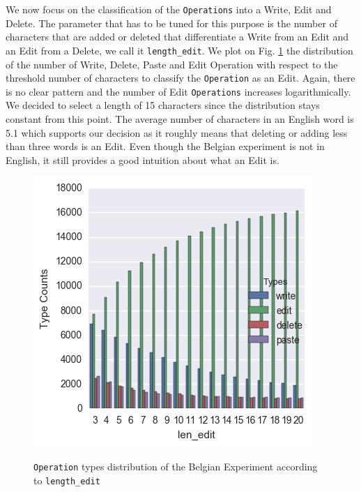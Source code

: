 \documentclass[a4, twocolumn, 12pt]{article}
\begin{document}
We now focus on the classification of the \texttt{Operations} into a Write, Edit and Delete. The parameter that has to be tuned for this purpose is the number of characters that are added or deleted that differentiate a Write from an Edit and an Edit from a Delete, we call it \texttt{length\_edit}. We plot on Fig. \ref{len_edit} the distribution of the number of Write, Delete, Paste and Edit Operation with respect to the threshold number of characters to classify the \texttt{Operation} as an Edit. Again, there is no clear pattern and the number of Edit \texttt{Operations} increases logarithmically. We decided to select a length of 15 characters since the distribution stays constant from this point. The average number of characters in an English word is 5.1 \cite{Bochkarev} which supports our decision as it roughly means that deleting or adding less than three words is an Edit. Even though the Belgian experiment is not in English, it still provides a good intuition about what an Edit is.
\begin{figure}[h]
\centering
\includegraphics[scale=0.72]{figures/len_edit.png}
\label{len_edit}
\caption{\texttt{Operation} types distribution of the Belgian Experiment according to \texttt{length\_edit}}
\end{figure}
\end{document}
